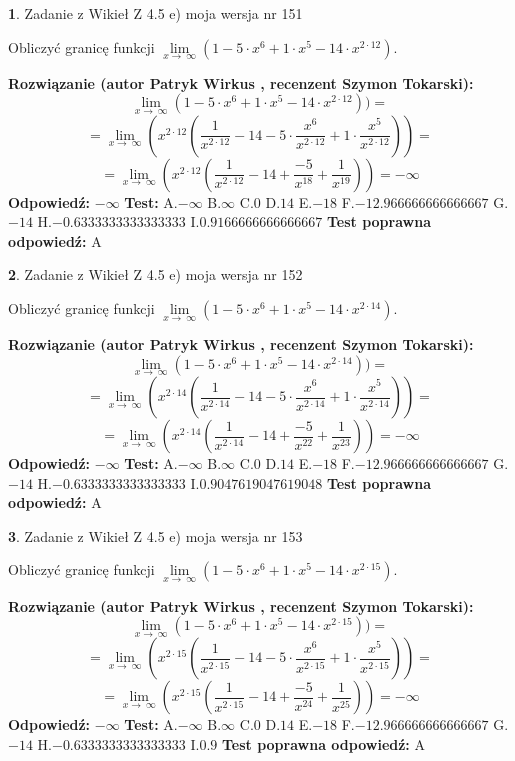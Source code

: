\documentclass[12pt, a4paper]{article}
\theoremstyle{definition} %
\newtheorem{zad}{}
\newcommand{\zadStart}[1]{\begin{zad}#1\newline}
\newcommand{\zadStop}{\end{zad}}
\newcommand{\rozwStart}[2]{\noindent \textbf{Rozwiązanie (autor #1 , recenzent #2): }\newline}
\newcommand{\rozwStop}{\newline}
\newcommand{\odpStart}{\noindent \textbf{Odpowiedź:}\newline}
\newcommand{\odpStop}{\newline}
\newcommand{\testStart}{\noindent \textbf{Test:}\newline}
\newcommand{\testStop}{\newline}
\newcommand{\kluczStart}{\noindent \textbf{Test poprawna odpowiedź:}\newline}
\newcommand{\kluczStop}{\newline}
\begin{document}
\zadStart{Zadanie z Wikieł Z 4.5 e) moja wersja nr 151}


Obliczyć granicę funkcji  $\lim\limits_{x\to\ \infty}(1 - 5 \cdot x^{6}+1 \cdot x^{5}- 14 \cdot x^{2\cdot12})$.
\zadStop
\rozwStart{Patryk Wirkus}{Szymon Tokarski}
$$\lim\limits_{x\to\ \infty}(1 - 5 \cdot x^{6}+1 \cdot x^{5}- 14 \cdot x^{2\cdot12}))=$$
$$=\lim\limits_{x\to\ \infty}(x^{2\cdot12}(\frac{1}{x^{2\cdot12}}-14 -5 \cdot \frac{x^{6}}{x^{2\cdot12}}+1 \cdot \frac{x^{5}}{x^{2\cdot12}}))=$$
$$=\lim\limits_{x\to\ \infty}(x^{2\cdot12}(\frac{1}{x^{2\cdot12}}-14 + \frac{-5}{x^{18}}+ \frac{1}{x^{19}}))=-\infty$$
\rozwStop
\odpStart
$-\infty$
\odpStop
\testStart
A.$-\infty$ B.$\infty$ C.$0$ D.$14$ E.$-18$
F.$-12.966666666666667$ G.$-14$
H.$-0.6333333333333333$
I.$0.9166666666666667$
\testStop
\kluczStart
A
\kluczStop



\zadStart{Zadanie z Wikieł Z 4.5 e) moja wersja nr 152}


Obliczyć granicę funkcji  $\lim\limits_{x\to\ \infty}(1 - 5 \cdot x^{6}+1 \cdot x^{5}- 14 \cdot x^{2\cdot14})$.
\zadStop
\rozwStart{Patryk Wirkus}{Szymon Tokarski}
$$\lim\limits_{x\to\ \infty}(1 - 5 \cdot x^{6}+1 \cdot x^{5}- 14 \cdot x^{2\cdot14}))=$$
$$=\lim\limits_{x\to\ \infty}(x^{2\cdot14}(\frac{1}{x^{2\cdot14}}-14 -5 \cdot \frac{x^{6}}{x^{2\cdot14}}+1 \cdot \frac{x^{5}}{x^{2\cdot14}}))=$$
$$=\lim\limits_{x\to\ \infty}(x^{2\cdot14}(\frac{1}{x^{2\cdot14}}-14 + \frac{-5}{x^{22}}+ \frac{1}{x^{23}}))=-\infty$$
\rozwStop
\odpStart
$-\infty$
\odpStop
\testStart
A.$-\infty$ B.$\infty$ C.$0$ D.$14$ E.$-18$
F.$-12.966666666666667$ G.$-14$
H.$-0.6333333333333333$
I.$0.9047619047619048$
\testStop
\kluczStart
A
\kluczStop



\zadStart{Zadanie z Wikieł Z 4.5 e) moja wersja nr 153}


Obliczyć granicę funkcji  $\lim\limits_{x\to\ \infty}(1 - 5 \cdot x^{6}+1 \cdot x^{5}- 14 \cdot x^{2\cdot15})$.
\zadStop
\rozwStart{Patryk Wirkus}{Szymon Tokarski}
$$\lim\limits_{x\to\ \infty}(1 - 5 \cdot x^{6}+1 \cdot x^{5}- 14 \cdot x^{2\cdot15}))=$$
$$=\lim\limits_{x\to\ \infty}(x^{2\cdot15}(\frac{1}{x^{2\cdot15}}-14 -5 \cdot \frac{x^{6}}{x^{2\cdot15}}+1 \cdot \frac{x^{5}}{x^{2\cdot15}}))=$$
$$=\lim\limits_{x\to\ \infty}(x^{2\cdot15}(\frac{1}{x^{2\cdot15}}-14 + \frac{-5}{x^{24}}+ \frac{1}{x^{25}}))=-\infty$$
\rozwStop
\odpStart
$-\infty$
\odpStop
\testStart
A.$-\infty$ B.$\infty$ C.$0$ D.$14$ E.$-18$
F.$-12.966666666666667$ G.$-14$
H.$-0.6333333333333333$
I.$0.9$
\testStop
\kluczStart
A
\kluczStop
\end{document}
